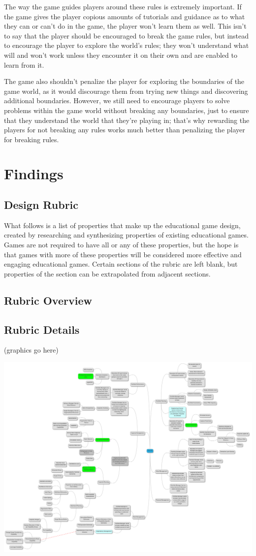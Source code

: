 \documentclass[12pt]{report}
\begin{document}
		The way the game guides players around these rules is extremely important. If the game gives the player copious amounts of tutorials and guidance as to what they can or can't do in the game, the player won't learn them as well. This isn't to say that the player should be encouraged to break the game rules, but instead to encourage the player to explore the world's rules; they won't understand what will and won't work unless they encounter it on their own and are enabled to learn from it.
	
		The game also shouldn't penalize the player for exploring the boundaries of the game world, as it would discourage them from trying new things and discovering additional boundaries. However, we still need to encourage players to solve problems within the game world without breaking any boundaries, just to ensure that they understand the world that they're playing in; that's why rewarding the players for not breaking any rules works much better than penalizing the player for breaking rules.

\section{Findings}
	\subsection{Design Rubric}
		What follows is a list of properties that make up the educational game design, created by researching and synthesizing properties of existing educational games. Games are not required to have all or any of these properties, but the hope is that games with more of these properties will be considered more effective and engaging educational games. Certain sections of the rubric are left blank, but properties of the section can be extrapolated from adjacent sections.
	\subsection{Rubric Overview}
	\subsection{Rubric Details}
		(graphics go here)

		\includegraphics[width = \textwidth]{./Orca_H3.png}
\end{document}
